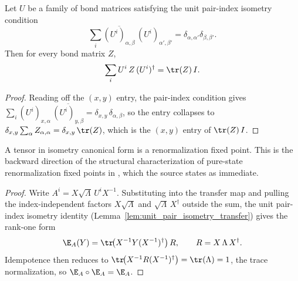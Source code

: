 \begin{lemma}%
    \label{lem:unit_pair_isometry_transfer}
    \leanok
    Let $U$ be a family of bond matrices satisfying the unit pair-index isometry
    condition
    \[
        \sum_i \overline{(U^i)_{\alpha,\beta}}\,(U^i)_{\alpha',\beta'}
        = \delta_{\alpha,\alpha'}\delta_{\beta,\beta'}.
    \]
    Then for every bond matrix $Z$,
    \[
        \sum_i U^i\,Z\,(U^i)^\dagger = \tr(Z)\,I.
    \]
\end{lemma}
\begin{proof}\leanok
    Reading off the $(x,y)$ entry, the pair-index condition gives
    $\sum_i (U^i)_{x,\alpha}\,\overline{(U^i)_{y,\beta}}
        = \delta_{x,y}\,\delta_{\alpha,\beta}$, so the entry collapses to
    $\delta_{x,y}\sum_\alpha Z_{\alpha,\alpha} = \delta_{x,y}\,\tr(Z)$, which is
    the $(x,y)$ entry of $\tr(Z)\,I$.
\end{proof}

\begin{theorem}%
    \label{thm:is_rfp_of_isometry_canonical_form}
    \leanok
    A tensor in isometry canonical form is a renormalization fixed point. This is
    the backward direction of the structural characterization of pure-state
    renormalization fixed points in \cite[Section~3]{Cirac2016MPDO_arXiv}, which
    the source states as immediate.
\end{theorem}
\begin{proof}\leanok
    Write $A^i = X\sqrt\Lambda\,U^i X^{-1}$. Substituting into the transfer map
    and pulling the index-independent factors $X\sqrt\Lambda$ and
    $\sqrt\Lambda\,X^\dagger$ outside the sum, the unit pair-index isometry
    identity (Lemma~\ref{lem:unit_pair_isometry_transfer}) gives the rank-one form
    \[
        \E_A(Y) = \tr\!\bigl(X^{-1} Y (X^{-1})^\dagger\bigr)\,R,
        \qquad R = X\,\Lambda\,X^\dagger.
    \]
    Idempotence then reduces to
    $\tr\!\bigl(X^{-1} R (X^{-1})^\dagger\bigr) = \tr(\Lambda) = 1$, the trace
    normalization, so $\E_A \circ \E_A = \E_A$.
\end{proof}

